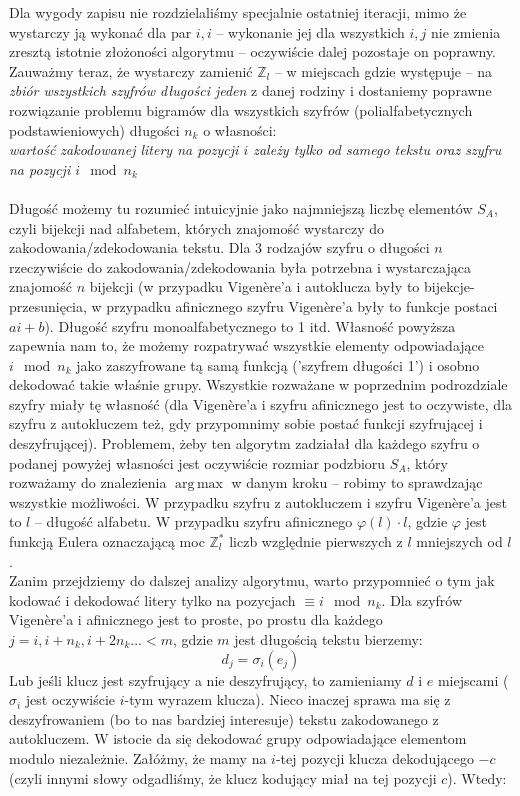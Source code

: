 \documentclass[a4paper]{article}
\DeclareMathOperator*{\argmax}{arg\,max}
\theoremstyle{defn}
\theoremstyle{theorem}
\theoremstyle{lemma}
\theoremstyle{cor}
\theoremstyle{fact}
\begin{document}
Dla wygody zapisu nie rozdzielaliśmy specjalnie ostatniej iteracji, mimo że wystarczy ją wykonać dla par $i,i$ – wykonanie jej dla wszystkich $i,j$ nie zmienia zresztą istotnie złożoności algorytmu – oczywiście dalej pozostaje on poprawny.
Zauważmy teraz, że wystarczy zamienić $\mathbb{Z}_l$ – w miejscach gdzie występuje – na \textit{zbiór wszystkich szyfrów długości jeden} z danej rodziny i dostaniemy poprawne rozwiązanie problemu bigramów dla wszystkich szyfrów (polialfabetycznych podstawieniowych) długości $n_k$ o własności:\\
\textit{wartość zakodowanej litery na pozycji $i$ zależy tylko od samego tekstu oraz szyfru na pozycji $i \mod n_k$}\\\\
Długość możemy tu rozumieć intuicyjnie jako najmniejszą liczbę elementów $S_A$, czyli bijekcji nad alfabetem, których znajomość wystarczy do zakodowania/zdekodowania tekstu. Dla 3 rodzajów szyfru o długości $n$ rzeczywiście do zakodowania/zdekodowania była potrzebna i wystarczająca znajomość $n$ bijekcji (w przypadku Vigenère'a i autoklucza były to bijekcje-przesunięcia, w przypadku afinicznego szyfru Vigenère'a były to funkcje postaci $ai+b$). Długość szyfru monoalfabetycznego to 1 itd. Własność powyższa zapewnia nam to, że możemy rozpatrywać wszystkie elementy odpowiadające $i \mod n_k$ jako zaszyfrowane tą samą funkcją ('szyfrem długości 1') i osobno dekodować takie właśnie grupy. Wszystkie rozważane w poprzednim podrozdziale szyfry miały tę własność (dla Vigenère'a i szyfru afinicznego jest to oczywiste, dla szyfru z autokluczem też, gdy przypomnimy sobie postać funkcji szyfrującej i deszyfrującej). Problemem, żeby ten algorytm zadziałał dla każdego szyfru o podanej powyżej własności jest oczywiście rozmiar podzbioru $S_A$, który rozważamy do znalezienia $\argmax$ w danym kroku – robimy to sprawdzając wszystkie możliwości. W przypadku szyfru z autokluczem i szyfru Vigenère'a jest to $l$ – długość alfabetu. W przypadku szyfru afinicznego $\varphi(l) \cdot l$, gdzie $\varphi$ jest funkcją Eulera oznaczającą moc $\mathbb{Z}_l^*$ liczb względnie pierwszych z $l$ mniejszych od $l$.\\
Zanim przejdziemy do dalszej analizy algorytmu, warto przypomnieć o tym jak kodować i dekodować litery tylko na pozycjach $\equiv i \mod n_k$.
Dla szyfrów Vigenère'a i afinicznego jest to proste, po prostu dla każdego $j = i, i+n_k, i+2n_k... < m$, gdzie $m$ jest długością tekstu bierzemy:
$$d_j = \sigma_i(e_j)$$
Lub jeśli klucz jest szyfrujący a nie deszyfrujący, to zamieniamy $d$ i $e$ miejscami ($\sigma_i$ jest oczywiście $i$-tym wyrazem klucza). Nieco inaczej sprawa ma się z deszyfrowaniem (bo to nas bardziej interesuje) tekstu zakodowanego z autokluczem. W istocie da się dekodować grupy odpowiadające elementom modulo niezależnie. Załóżmy, że mamy na $i$-tej pozycji klucza dekodującego $-c$ (czyli innymi słowy odgadliśmy, że klucz kodujący miał na tej pozycji $c$). Wtedy:
\end{document}
